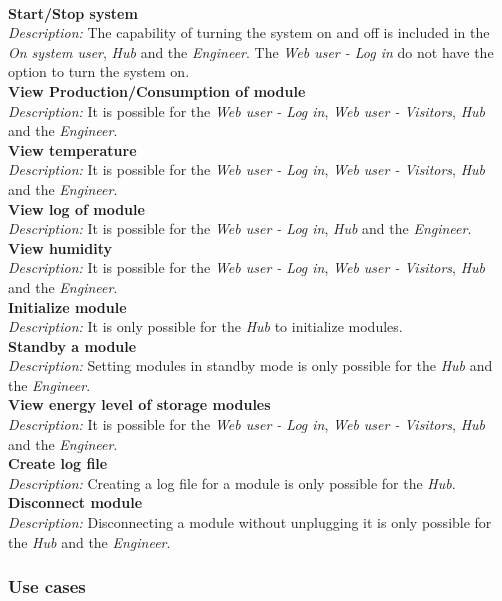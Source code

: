 	\\\textbf{Start/Stop system}
	\\\textit{Description: }
	The capability of turning the system on and off is included in the \textit{On system user}, \textit{Hub} and the \textit{Engineer}. The \textit{Web user - Log in} do not have the option to turn the system on.
	\\\textbf{View Production/Consumption of module}
	\\\textit{Description: }
	It is possible for the \textit{Web user - Log in}, \textit{Web user - Visitors}, \textit{Hub} and the \textit{Engineer}.
	\\\textbf{View temperature}
	\\\textit{Description: }
	It is possible for the \textit{Web user - Log in}, \textit{Web user - Visitors}, \textit{Hub} and the \textit{Engineer}.
	\\\textbf{View log of module}
	\\\textit{Description: }
	It is possible for the \textit{Web user - Log in}, \textit{Hub} and the \textit{Engineer}.
	\\\textbf{View humidity}
	\\\textit{Description: }
	It is possible for the \textit{Web user - Log in}, \textit{Web user - Visitors}, \textit{Hub} and the \textit{Engineer}.
	\\\textbf{Initialize module}
	\\\textit{Description: }
	It is only possible for the \textit{Hub} to initialize modules.
	\\\textbf{Standby a module}
	\\\textit{Description: }
	Setting modules in standby mode is only possible for the \textit{Hub} and the \textit{Engineer}.
	\\\textbf{View energy level of storage modules}
	\\\textit{Description: }
	It is possible for the \textit{Web user - Log in}, \textit{Web user - Visitors}, \textit{Hub} and the \textit{Engineer}.
	\\\textbf{Create log file}
	\\\textit{Description: }
	Creating a log file for a module is only possible for the \textit{Hub}.
	\\\textbf{Disconnect module}
	\\\textit{Description: }
	Disconnecting a module without unplugging it is only possible for the \textit{Hub} and the \textit{Engineer}.
\subsubsection{Use cases}

